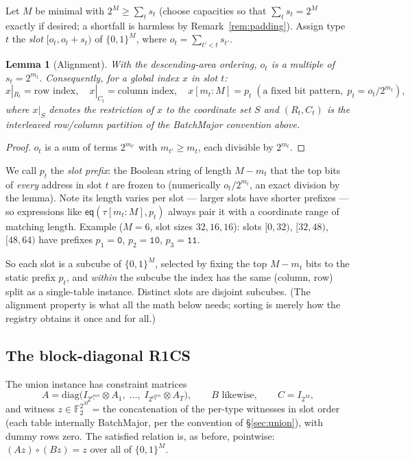\documentclass[11pt]{article}
\newcommand{\F}{\mathbb{F}}                       %
\newcommand{\Ftwo}{\F_2}
\newcommand{\eq}{\mathsf{eq}}
\newtheorem{lemma}{Lemma}
\theoremstyle{definition}
\begin{document}
Let $M$ be minimal with $2^{M} \ge \sum_t s_t$ (choose capacities so that
$\sum_t s_t = 2^{M}$ exactly if desired; a shortfall is harmless by
Remark~\ref{rem:padding}). Assign type $t$ the \emph{slot}
$[o_t, o_t + s_t)$ of $\{0,1\}^{M}$, where $o_t = \sum_{t' < t} s_{t'}$.

\begin{lemma}[Alignment]\label{lem:align}
With the descending-area ordering, $o_t$ is a multiple of $s_t = 2^{m_t}$.
Consequently, for a global index $x$ in slot $t$:
\[
  x|_{R_t} = \text{row index},\quad
  x|_{C_t} = \text{column index},\quad
  x[m_t{:}M] = p_t \;(\text{a fixed bit pattern}, \; p_t = o_t / 2^{m_t}),
\]
where $x|_S$ denotes the restriction of $x$ to the coordinate set $S$ and
$(R_t, C_t)$ is the interleaved row/column partition of the BatchMajor
convention above.
\end{lemma}
\begin{proof}
$o_t$ is a sum of terms $2^{m_{t'}}$ with $m_{t'} \ge m_t$, each divisible by
$2^{m_t}$.
\end{proof}

We call $p_t$ the \emph{slot prefix}: the Boolean string of length
$M - m_t$ that the top bits of \emph{every} address in slot $t$ are frozen
to (numerically $o_t / 2^{m_t}$, an exact division by the lemma). Note its
length varies per slot --- larger slots have shorter prefixes --- so
expressions like $\eq(\tau[m_t{:}M], p_t)$ always pair it with a
coordinate range of matching length. Example ($M = 6$, slot sizes
$32, 16, 16$): slots $[0,32)$, $[32,48)$, $[48,64)$ have prefixes
$p_1 = \mathtt{0}$, $p_2 = \mathtt{10}$, $p_3 = \mathtt{11}$.

So each slot is a subcube of $\{0,1\}^M$, selected by fixing the top
$M - m_t$ bits to the static prefix $p_t$, and \emph{within} the
subcube the index has the same (column, row) split as a single-table
instance. Distinct slots are disjoint subcubes. (The alignment property is
what all the math below needs; sorting is merely how the registry obtains
it once and for all.)

\subsection{The block-diagonal R1CS}

The union instance has constraint matrices
\[
  A = \mathrm{diag}\bigl(I_{2^{\nu_1^{\max}}} \otimes A_1,\; \dots,\;
                         I_{2^{\nu_T^{\max}}} \otimes A_T\bigr),
  \qquad B \text{ likewise}, \qquad C = I_{2^M},
\]
and witness $z \in \Ftwo^{2^M}$ = the concatenation of the per-type
witnesses in slot order (each table internally BatchMajor, per the
convention of \S\ref{sec:union}), with dummy rows zero. The satisfied relation is, as before, pointwise:
$(Az) \circ (Bz) = z$ over all of $\{0,1\}^M$.
\end{document}
